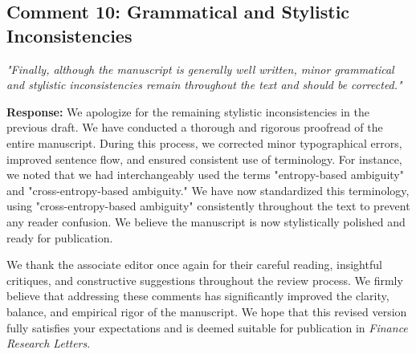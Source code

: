 \documentclass[12pt]{article}
\begin{document}
\subsection*{Comment 10: Grammatical and Stylistic Inconsistencies}
\textit{"Finally, although the manuscript is generally well written, minor grammatical and stylistic inconsistencies remain throughout the text and should be corrected."}

\begin{highlightbox}
\textbf{Response:} We apologize for the remaining stylistic inconsistencies in the previous draft. We have conducted a thorough and rigorous proofread of the entire manuscript. During this process, we corrected minor typographical errors, improved sentence flow, and ensured consistent use of terminology. For instance, we noted that we had interchangeably used the terms "entropy-based ambiguity" and "cross-entropy-based ambiguity." We have now standardized this terminology, using "cross-entropy-based ambiguity" consistently throughout the text to prevent any reader confusion. We believe the manuscript is now stylistically polished and ready for publication.
\end{highlightbox}

\vspace{0.5cm}
We thank the associate editor once again for their careful reading, insightful critiques, and constructive suggestions throughout the review process. We firmly believe that addressing these comments has significantly improved the clarity, balance, and empirical rigor of the manuscript. We hope that this revised version fully satisfies your expectations and is deemed suitable for publication in \textit{Finance Research Letters}.
\end{document}
